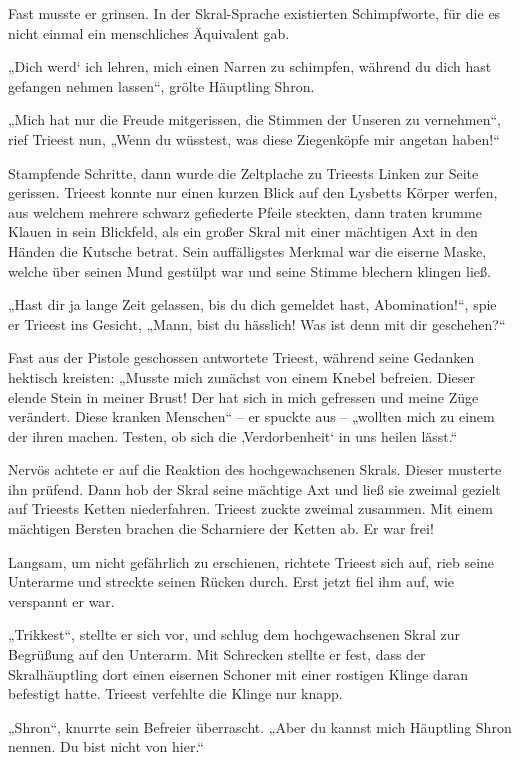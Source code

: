 Fast musste er grinsen. In der Skral-Sprache existierten Schimpfworte, für die es nicht einmal ein menschliches Äquivalent gab.

„Dich werd‘ ich lehren, mich einen Narren zu schimpfen, während du dich hast gefangen nehmen lassen“, grölte Häuptling Shron.

„Mich hat nur die Freude mitgerissen, die Stimmen der Unseren zu vernehmen“, rief Trieest nun, „Wenn du wüsstest, was diese Ziegenköpfe mir angetan haben!“

Stampfende Schritte, dann wurde die Zeltplache zu Trieests Linken zur Seite gerissen. Trieest konnte nur einen kurzen Blick auf den Lysbetts Körper werfen, aus welchem mehrere schwarz gefiederte Pfeile steckten, dann traten krumme Klauen in sein Blickfeld, als ein großer Skral mit einer mächtigen Axt in den Händen die Kutsche betrat. Sein auffälligstes Merkmal war die eiserne Maske, welche über seinen Mund gestülpt war und seine Stimme blechern klingen ließ.

„Hast dir ja lange Zeit gelassen, bis du dich gemeldet hast, Abomination!“, spie er Trieest ins Gesicht, „Mann, bist du hässlich! Was ist denn mit dir geschehen?“

Fast aus der Pistole geschossen antwortete Trieest, während seine Gedanken hektisch kreisten: „Musste mich zunächst von einem Knebel befreien. Dieser elende Stein in meiner Brust! Der hat sich in mich gefressen und meine Züge verändert. Diese kranken Menschen“ – er spuckte aus – „wollten mich zu einem der ihren machen. Testen, ob sich die ‚Verdorbenheit‘ in uns heilen lässt.“

Nervös achtete er auf die Reaktion des hochgewachsenen Skrals. Dieser musterte ihn prüfend. Dann hob der Skral seine mächtige Axt und ließ sie zweimal gezielt auf Trieests Ketten niederfahren. Trieest zuckte zweimal zusammen. Mit einem mächtigen Bersten brachen die Scharniere der Ketten ab. Er war frei!

Langsam, um nicht gefährlich zu erschienen, richtete Trieest sich auf, rieb seine Unterarme und streckte seinen Rücken durch. Erst jetzt fiel ihm auf, wie verspannt er war.

„Trikkest“, stellte er sich vor, und schlug dem hochgewachsenen Skral zur Begrüßung auf den Unterarm. Mit Schrecken stellte er fest, dass der Skralhäuptling dort einen eisernen Schoner mit einer rostigen Klinge daran befestigt hatte. Trieest verfehlte die Klinge nur knapp.

„Shron“, knurrte sein Befreier überrascht. „Aber du kannst mich Häuptling Shron nennen. Du bist nicht von hier.“

